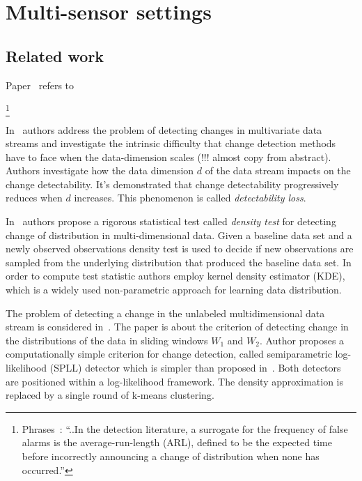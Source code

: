 \chapter{Multi-sensor settings}

\section{Related work}

Paper~\cite{Xie} refers to~\cite{mei2010efficient}

\footnote{Phrases~\cite{Xie}: ``..In the \changepoint detection literature, a surrogate for the frequency of false alarms is the average-run-length (ARL), defined to be the expected time before incorrectly announcing a change of distribution when none has occurred.''}

In~\cite{CesareAlippiMultisensor} authors address the problem of detecting changes in multivariate data streams and investigate the intrinsic difficulty that change detection methods have to face when the data-dimension scales (!!! almost copy from abstract).
Authors investigate how the data dimension $d$ of the data stream impacts on the change detectability.
It's demonstrated that change detectability progressively reduces when $d$ increases. This phenomenon is called \textit{detectability loss}.

In~\cite{SongStatChpMulti} authors propose a rigorous statistical test called \textit{density test} for detecting change of distribution in multi-dimensional data.
Given a baseline data set and a newly observed observations density test is used to decide if new observations are sampled from the underlying distribution that produced the baseline data set.
In order to compute test statistic authors employ kernel density estimator (KDE), which is a widely used non-parametric approach for learning data distribution.

The problem of detecting a change in the unlabeled multidimensional data stream is considered in~\cite{KuchevaMultiSensor}. 
The paper is about the criterion of detecting change in the distributions of the data in sliding windows $W_1$ and $W_2$.
Author proposes a computationally simple criterion for change detection, called semiparametric log-likelihood (SPLL) detector which is simpler than proposed in~\cite{SongStatChpMulti}. 
Both detectors are positioned within a log-likelihood framework.
The density approximation is replaced by a single round of k-means clustering.

